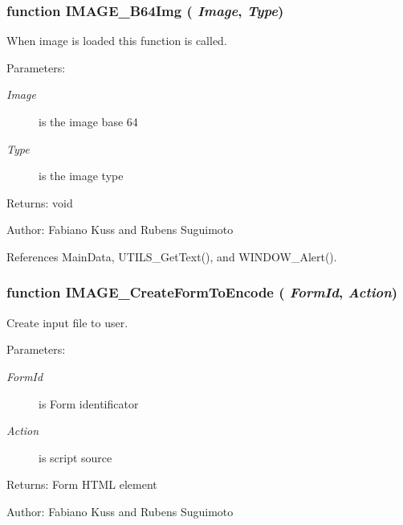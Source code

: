 \subsubsection[IMAGE\_\-B64Img]{\setlength{\rightskip}{0pt plus 5cm}function IMAGE\_\-B64Img ( {\em Image}, \/   {\em Type})}\label{images_8js_e730395a6a27983187763699aca61c27}


When image is loaded this function is called. 

\begin{Desc}
\item[Parameters:]
\begin{description}
\item[{\em Image}]is the image base 64 \item[{\em Type}]is the image type \end{description}
\end{Desc}
\begin{Desc}
\item[Returns:]void \end{Desc}
\begin{Desc}
\item[Author:]Fabiano Kuss and Rubens Suguimoto \end{Desc}


References MainData, UTILS\_\-GetText(), and WINDOW\_\-Alert().
\subsubsection[IMAGE\_\-CreateFormToEncode]{\setlength{\rightskip}{0pt plus 5cm}function IMAGE\_\-CreateFormToEncode ( {\em FormId}, \/   {\em Action})}\label{images_8js_e981c582022ac7fdd9ada65e763adde8}


Create input file to user. 

\begin{Desc}
\item[Parameters:]
\begin{description}
\item[{\em FormId}]is Form identificator \item[{\em Action}]is script source \end{description}
\end{Desc}
\begin{Desc}
\item[Returns:]Form HTML element \end{Desc}
\begin{Desc}
\item[Author:]Fabiano Kuss and Rubens Suguimoto \end{Desc}


